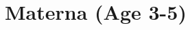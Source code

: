\documentclass[12pt]{article}
\begin{document}
\clearpage
\singlespacing
\listoftables

%
%
%

%
%
%

%
%
%

%
%
%

%
%
%

%
%
%



\section{Materna (Age 3-5)}
\end{document}
